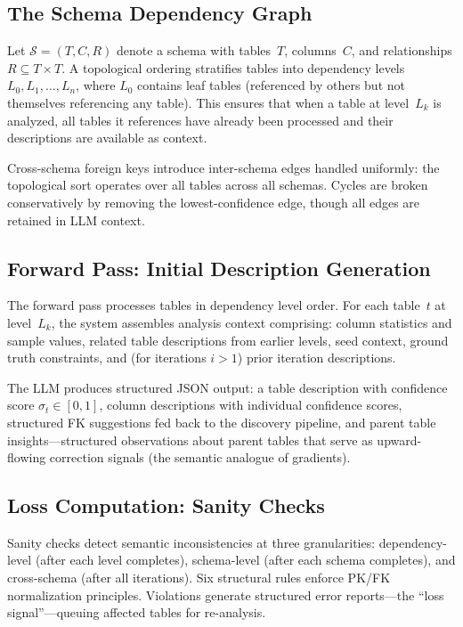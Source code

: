 \documentclass[sigconf, nonacm]{acmart}
\begin{document}
\subsection{The Schema Dependency Graph}

Let $\mathcal{S} = (T, C, R)$ denote a schema with tables~$T$, columns~$C$, and relationships $R \subseteq T \times T$. A topological ordering stratifies tables into dependency levels $L_0, L_1, \ldots, L_n$, where $L_0$ contains leaf tables (referenced by others but not themselves referencing any table). This ensures that when a table at level~$L_k$ is analyzed, all tables it references have already been processed and their descriptions are available as context.

Cross-schema foreign keys introduce inter-schema edges handled uniformly: the topological sort operates over all tables across all schemas. Cycles are broken conservatively by removing the lowest-confidence edge, though all edges are retained in LLM context.

\subsection{Forward Pass: Initial Description Generation}

The forward pass processes tables in dependency level order. For each table~$t$ at level~$L_k$, the system assembles analysis context comprising: column statistics and sample values, related table descriptions from earlier levels, seed context, ground truth constraints, and (for iterations $i > 1$) prior iteration descriptions.

The LLM produces structured JSON output: a table description with confidence score $\sigma_t \in [0, 1]$, column descriptions with individual confidence scores, structured FK suggestions fed back to the discovery pipeline, and parent table insights---structured observations about parent tables that serve as upward-flowing correction signals (the semantic analogue of gradients).

\subsection{Loss Computation: Sanity Checks}

Sanity checks detect semantic inconsistencies at three granularities: dependency-level (after each level completes), schema-level (after each schema completes), and cross-schema (after all iterations). Six structural rules enforce PK/FK normalization principles. Violations generate structured error reports---the ``loss signal''---queuing affected tables for re-analysis.
\end{document}
